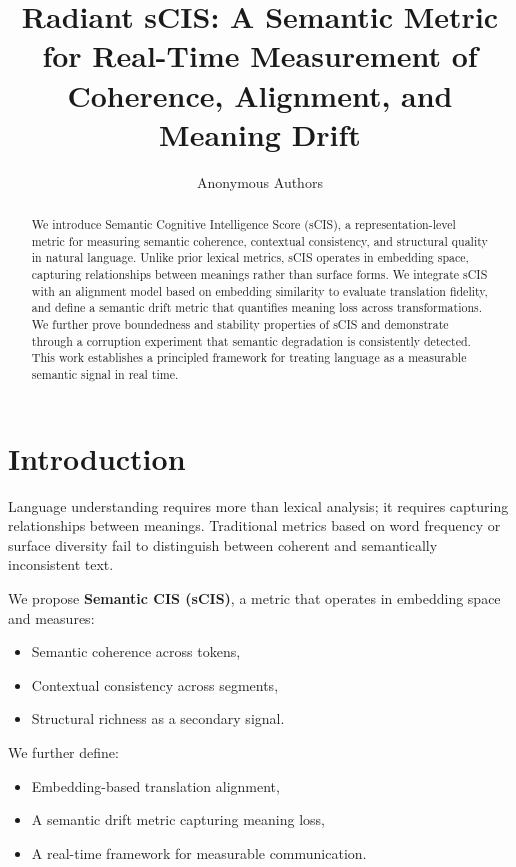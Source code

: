 \documentclass{article}
\title{Radiant sCIS: A Semantic Metric for Real-Time Measurement of Coherence, Alignment, and Meaning Drift}
\author{
Anonymous Authors
}
\theoremstyle{definition}
\begin{document}
\maketitle

\begin{abstract}
We introduce Semantic Cognitive Intelligence Score (sCIS), a representation-level metric for measuring semantic coherence, contextual consistency, and structural quality in natural language. Unlike prior lexical metrics, sCIS operates in embedding space, capturing relationships between meanings rather than surface forms. We integrate sCIS with an alignment model based on embedding similarity to evaluate translation fidelity, and define a semantic drift metric that quantifies meaning loss across transformations. We further prove boundedness and stability properties of sCIS and demonstrate through a corruption experiment that semantic degradation is consistently detected. This work establishes a principled framework for treating language as a measurable semantic signal in real time.
\end{abstract}

\section{Introduction}

Language understanding requires more than lexical analysis; it requires capturing relationships between meanings. Traditional metrics based on word frequency or surface diversity fail to distinguish between coherent and semantically inconsistent text.

We propose \textbf{Semantic CIS (sCIS)}, a metric that operates in embedding space and measures:
\begin{itemize}[noitemsep]
    \item Semantic coherence across tokens,
    \item Contextual consistency across segments,
    \item Structural richness as a secondary signal.
\end{itemize}

We further define:
\begin{itemize}[noitemsep]
    \item Embedding-based translation alignment,
    \item A semantic drift metric capturing meaning loss,
    \item A real-time framework for measurable communication.
\end{itemize}
\end{document}
